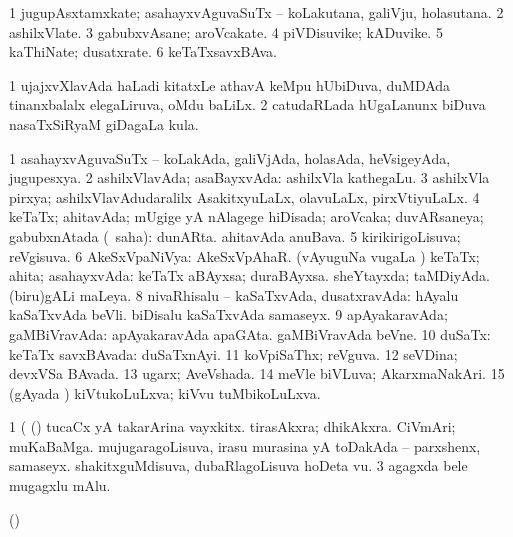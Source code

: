 \bentry
{}
\gl{\nA}
\bmng
\bnum
\num{1} jugupAsxtamxkate; asahayxvAguvaSuTx -- koLakutana, galiVju, holasutana. 
\num{2} ashilxVlate. 
\num{3} gabubxvAsane; aroVcakate. 
\num{4} piVDisuvike; kADuvike. 
\num{5} kaThiNate; dusatxrate. 
\num{6} keTaTxsavxBAva. 
\enum
\emng
\eentry

\bentry
{}
\gl{\nA}
\bmng
\bnum
\num{1} ujajxvXlavAda haLadi kitatxLe athavA keMpu hUbiDuva, duMDAda tinanxbalalx elegaLiruva, oMdu baLiLx. 
\num{2} catudaRLada hUgaLanunx biDuva nasaTxSiRyaM giDagaLa kula. 
\enum
\emng
\eentry

\bentry
{}
\gl{\gu}
\bmng
\bnum
\num{1} asahayxvAguvaSuTx -- koLakAda, galiVjAda, holasAda, heVsigeyAda, jugupesxya. 
\num{2} ashilxVlavAda; asaBayxvAda:  ashilxVla kathegaLu. 
\num{3} ashilxVla pirxya; ashilxVlavAdudaralilx AsakitxyuLaLx, olavuLaLx, pirxVtiyuLaLx. 
\num{4} keTaTx; ahitavAda; mUgige yA nAlagege hiDisada; aroVcaka; duvARsaneya; gabubxnAtada (\rUpa\ saha):  dunARta.  ahitavAda anuBava. 
\num{5} kirikirigoLisuva; reVgisuva. 
\num{6} AkeSxVpaNiVya: AkeSxVpAhaR. 
 (vAyuguNa \mo vugaLa \vi) 
\banum
{} keTaTx; ahita; asahayxvAda:  keTaTx aBAyxsa; duraBAyxsa. 
 sheYtayxda; taMDiyAda. 
 (biru)gALi maLeya. 
\eanum
\numie
\num{8} nivaRhisalu -- kaSaTxvAda, dusatxravAda:  hAyalu kaSaTxvAda beVli.  biDisalu kaSaTxvAda samaseyx. 
\num{9} apAyakaravAda; gaMBiVravAda:  apAyakaravAda apaGAta.  gaMBiVravAda beVne. 
\num{10} duSaTx: keTaTx savxBAvada:  duSaTxnAyi. 
\num{11} koVpiSaThx; reVguva. 
\num{12} seVDina; devxVSa BAvada. 
\num{13} ugarx; AveVshada. 
\num{14} meVle biVLuva; AkarxmaNakAri. 
\num{15} (gAyada \vi) kiVtukoLuLxva; kiVvu tuMbikoLuLxva. 
\enum
\emng

\noindent
\gl{\pagu}
\bmng
\bnum
\num{1} (  (\AmA) tucaCx yA takarArina vayxkitx. 
  
\banum
{} tirasAkxra; dhikAkxra. 
 CiVmAri; muKaBaMga. 
 mujugaragoLisuva, irasu murasina yA toDakAda -- parxshenx, samaseyx. 
 shakitxguMdisuva, dubaRlagoLisuva hoDeta \mo vu. 
\eanum
\numie
\num{3}  agagxda bele mugagxlu mAlu. 
\enum
\emng
\eentry

\bentry
{}
\gl{\saMkiSx}
\bmng
(\birx)  
\emng
\eentry

